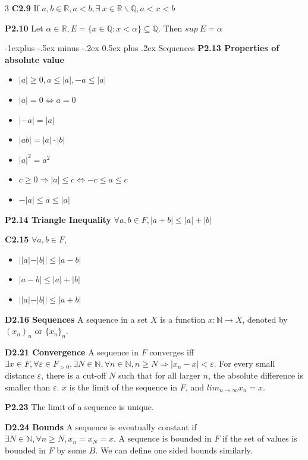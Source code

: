 \documentclass[10pt, landscape]{article}
\makeatletter
\renewcommand{\section}{\@startsection{section}{1}{0mm}%
                                {-1ex plus -.5ex minus -.2ex}%
                                {0.5ex plus .2ex}%
                                {\normalfont\large\bfseries}}
\renewcommand{\section}{\@startsection{section}{2}{0mm}%
                                {-1explus -.5ex minus -.2ex}%
                                {0.5ex plus .2ex}%
                                {\normalfont\normalsize\bfseries}}
\makeatother
\begin{document}
\begin{multicols*}{3}
\textbf{C2.9} If $a,b \in \mathbb{R}, a<b, \exists \ x \in \mathbb{R} \backslash \mathbb{Q}, a<x<b$

\textbf{P2.10} Let $\alpha \in \mathbb{R}, E=\{x \in \mathbb{Q}: x < \alpha\} \subseteq \mathbb{Q}$. Then $sup \ E = \alpha$

\section{Sequences}
\textbf{P2.13 Properties of absolute value}
\begin{itemize}
    \item $|a| \geq 0, a \leq |a|, -a \leq |a|$
    \item $|a|=0 \Leftrightarrow a = 0$
    \item $|-a|=|a|$
    \item $|ab|=|a|\cdot |b|$
    \item $|a|^2=a^2$
    \item $c \geq 0 \Rightarrow |a| \leq c \Leftrightarrow -c \leq a \leq c$
    \item $-|a| \leq a \leq |a|$
\end{itemize}

\textbf{P2.14 Triangle Inequality} $\forall a, b \in F, |a+b| \leq |a|+|b|$

\textbf{C2.15} $\forall a, b \in F$,
\begin{itemize}
    \item $||a|-|b|| \leq |a-b|$
    \item $|a-b| \leq |a|+|b|$
    \item $||a|-|b|| \leq |a+b|$
\end{itemize}

\textbf{D2.16 Sequences} A sequence in a set $X$ is a function $x:\mathbb{N}\rightarrow X$, denoted by $(x_n)_n$ or $\{x_n\}_n$.

\textbf{D2.21 Convergence} A sequence in $F$ converges iff $\exists x \in F, \forall \varepsilon \in F_{>0}, \exists N \in \mathbb{N}, \forall n \in \mathbb{N}, n \geq N \Rightarrow |x_n-x| < \varepsilon$. For every small distance $\varepsilon$, there is a cut-off $N$ such that for all larger $n$, the absolute difference is smaller than $\varepsilon$. $x$ is the limit of the sequence in $F$, and $lim_{n\rightarrow\infty}x_n=x$.

\textbf{P2.23} The limit of a sequence is unique.

\textbf{D2.24 Bounds} A sequence is eventually constant if $\exists N \in \mathbb{N}, \forall n \geq N, x_n=x_N=x$. A sequence is bounded in $F$ if the set of values is bounded in $F$ by some $B$. We can define one sided bounds similarly.


\end{multicols*}
\end{document}
